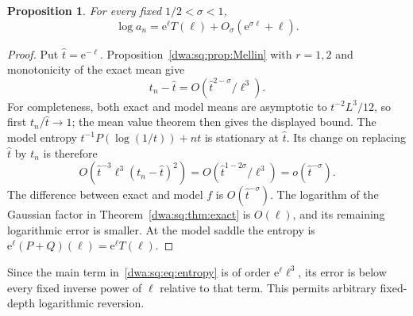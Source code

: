 \documentclass[11pt,letterpaper]{article}
\numberwithin{equation}{section}
\newtheorem{proposition}[theorem]{Proposition}
\theoremstyle{remark}
\newcommand{\e}{\mathrm e}
\begin{document}
\begin{proposition}\label{dwa:sq:prop:model}
For every fixed $1/2<\sigma<1$,
\begin{equation}\label{dwa:sq:eq:entropy}
 \log a_n=\e^\ell T(\ell)+O_\sigma(\e^{\sigma\ell}+\ell).
\end{equation}
\end{proposition}
\begin{proof}
Put $\widehat t=\e^{-\ell}$. Proposition~\ref{dwa:sq:prop:Mellin} with $r=1,2$ and monotonicity of the exact mean give
\[
 t_n-\widehat t=O(\widehat t^{2-\sigma}/\ell^3).
\]
For completeness, both exact and model means are asymptotic to $t^{-2}L^3/12$, so first $t_n/\widehat t\to1$; the mean value theorem then gives the displayed bound. The model entropy $t^{-1}P(\log(1/t))+nt$ is stationary at $\widehat t$. Its change on replacing $\widehat t$ by $t_n$ is therefore
\[
 O\left(\widehat t^{-3}\ell^3(t_n-\widehat t)^2\right)
 =O(\widehat t^{1-2\sigma}/\ell^3)=o(\widehat t^{-\sigma}).
\]
The difference between exact and model $f$ is $O(\widehat t^{-\sigma})$. The logarithm of the Gaussian factor in Theorem~\ref{dwa:sq:thm:exact} is $O(\ell)$, and its remaining logarithmic error is smaller. At the model saddle the entropy is $\e^\ell(P+Q)(\ell)=\e^\ell T(\ell)$.
\end{proof}
Since the main term in~\eqref{dwa:sq:eq:entropy} is of order $\e^\ell\ell^3$, its error is below every fixed inverse power of $\ell$ relative to that term. This permits arbitrary fixed-depth logarithmic reversion.
\end{document}
